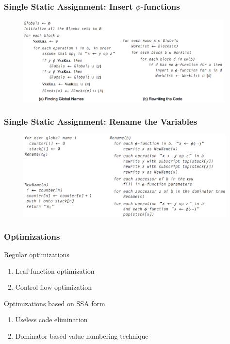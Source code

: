 \documentclass{beamer}
\begin{document}
	\begin{frame}
		\frametitle{Single Static Assignment: Insert $\phi$-functions}
		\begin{figure}[!htp]
			\includegraphics[height=4.5cm]{image/single-static-assignment/insert-phi-functions}
		\end{figure}
	\end{frame}

	\begin{frame}
		\frametitle{Single Static Assignment: Rename the Variables}
		\begin{figure}[!htp]
			\includegraphics[height=4.5cm]{image/single-static-assignment/rename-the-variables}
		\end{figure}
	\end{frame}
	
	\begin{frame}
		\frametitle{Optimizations}
		\begin{block}{Regular optimizations}
			\begin{enumerate}
				\item Leaf function optimization
				\item Control flow optimization
			\end{enumerate}
		\end{block}
		\begin{alertblock}{Optimizations based on SSA form}
			\begin{enumerate}
			\item Useless code elimination
			\item Dominator-based value numbering technique
			\end{enumerate}
		\end{alertblock}
	\end{frame}
	
\end{document}
